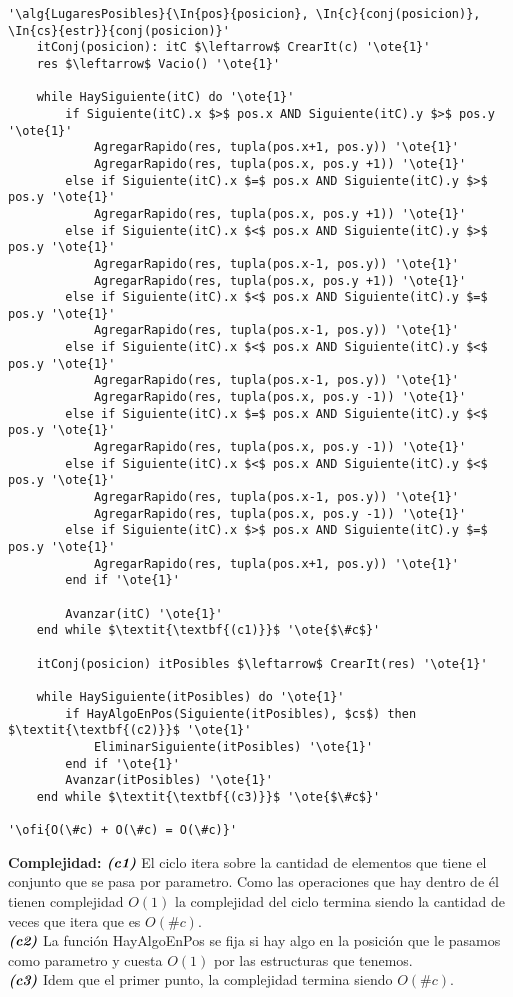 \begin{lstlisting}[mathescape]
'\alg{LugaresPosibles}{\In{pos}{posicion}, \In{c}{conj(posicion)}, \In{cs}{estr}}{conj(posicion)}'
	itConj(posicion): itC $\leftarrow$ CrearIt(c) '\ote{1}'
	res $\leftarrow$ Vacio() '\ote{1}'

	while HaySiguiente(itC) do '\ote{1}'
		if Siguiente(itC).x $>$ pos.x AND Siguiente(itC).y $>$ pos.y '\ote{1}'
			AgregarRapido(res, tupla(pos.x+1, pos.y)) '\ote{1}'
			AgregarRapido(res, tupla(pos.x, pos.y +1)) '\ote{1}'
		else if Siguiente(itC).x $=$ pos.x AND Siguiente(itC).y $>$ pos.y '\ote{1}'
			AgregarRapido(res, tupla(pos.x, pos.y +1)) '\ote{1}'
		else if Siguiente(itC).x $<$ pos.x AND Siguiente(itC).y $>$ pos.y '\ote{1}'
			AgregarRapido(res, tupla(pos.x-1, pos.y)) '\ote{1}'
			AgregarRapido(res, tupla(pos.x, pos.y +1)) '\ote{1}'
		else if Siguiente(itC).x $<$ pos.x AND Siguiente(itC).y $=$ pos.y '\ote{1}'
			AgregarRapido(res, tupla(pos.x-1, pos.y)) '\ote{1}'
		else if Siguiente(itC).x $<$ pos.x AND Siguiente(itC).y $<$ pos.y '\ote{1}'
			AgregarRapido(res, tupla(pos.x-1, pos.y)) '\ote{1}'
			AgregarRapido(res, tupla(pos.x, pos.y -1)) '\ote{1}'
		else if Siguiente(itC).x $=$ pos.x AND Siguiente(itC).y $<$ pos.y '\ote{1}'
			AgregarRapido(res, tupla(pos.x, pos.y -1)) '\ote{1}'
		else if Siguiente(itC).x $<$ pos.x AND Siguiente(itC).y $<$ pos.y '\ote{1}'
			AgregarRapido(res, tupla(pos.x-1, pos.y)) '\ote{1}'
			AgregarRapido(res, tupla(pos.x, pos.y -1)) '\ote{1}'
		else if Siguiente(itC).x $>$ pos.x AND Siguiente(itC).y $=$ pos.y '\ote{1}'
			AgregarRapido(res, tupla(pos.x+1, pos.y)) '\ote{1}'
		end if '\ote{1}'

		Avanzar(itC) '\ote{1}'
	end while $\textit{\textbf{(c1)}}$ '\ote{$\#c$}'

	itConj(posicion) itPosibles $\leftarrow$ CrearIt(res) '\ote{1}'

	while HaySiguiente(itPosibles) do '\ote{1}'
		if HayAlgoEnPos(Siguiente(itPosibles), $cs$) then $\textit{\textbf{(c2)}}$ '\ote{1}'
			EliminarSiguiente(itPosibles) '\ote{1}'
		end if '\ote{1}'
		Avanzar(itPosibles) '\ote{1}'
	end while $\textit{\textbf{(c3)}}$ '\ote{$\#c$}'

'\ofi{O(\#c) + O(\#c) = O(\#c)}'
\end{lstlisting}

\textbf{Complejidad:} $\textit{\textbf{(c1)}}$ El ciclo itera sobre la cantidad de elementos que tiene el conjunto que se pasa por parametro. Como las operaciones que hay dentro de él tienen complejidad $O(1)$ la complejidad del ciclo termina siendo la cantidad de veces que itera que es $O(\#c)$. \\
$\textit{\textbf{(c2)}}$ La función HayAlgoEnPos se fija si hay algo en la posición que le pasamos como parametro y cuesta $O(1)$ por las estructuras que tenemos. \\
$\textit{\textbf{(c3)}}$ Idem que el primer punto, la complejidad termina siendo $O(\#c)$.

